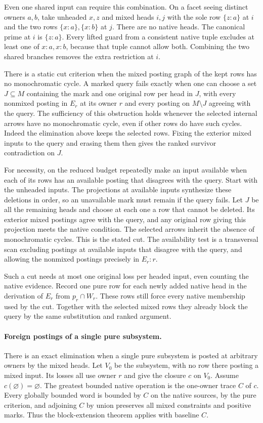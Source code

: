 Even one shared input can require this combination.
On a facet seeing distinct owners $a,b$, take unheaded
$x,z$ and mixed heads $i,j$ with the sole row
$\{z:a\}$ at $i$ and the two rows $\{x:a\},\{x:b\}$
at $j$. There are no native heads. The canonical prime
at $i$ is $\{z:a\}$. Every lifted guard from a consistent
native tuple excludes at least one of $x:a,x:b$, because
that tuple cannot allow both. Combining the two shared
branches removes the extra restriction at $i$.

There is a static cut criterion when the mixed posting
graph of the kept rows has no monochromatic cycle.
A marked query fails
exactly when one can choose a set $J\subseteq M$ containing
the mark and one original row per head in $J$, with
every nonmixed posting in $E_r$ at its owner $r$ and
every posting on $M\setminus J$ agreeing with the query.
The sufficiency of this obstruction holds whenever the
selected internal arrows have no monochromatic cycle,
even if other rows do have such cycles. Indeed the
elimination above keeps the selected rows. Fixing the
exterior mixed inputs to the query and erasing them
then gives the ranked survivor contradiction on $J$.

For necessity, on the reduced budget repeatedly make
an input available when each of its rows has an
available posting that disagrees with the query.
Start with the unheaded inputs. The projections at
available inputs synthesize these deletions in order,
so an unavailable mark must remain if the query fails.
Let $J$ be all the remaining heads and choose at each
one a row that cannot be deleted. Its exterior mixed
postings agree with the query, and any original row
giving this projection meets the native condition.
The selected arrows inherit the absence of monochromatic
cycles. This is the stated cut. The availability
test is a transversal scan excluding postings at
available inputs that disagree with the query, and
allowing the nonmixed postings precisely in $E_r:r$.

Such a cut needs at most one original loss per headed
input, even counting the native evidence. Record one
pure row for each newly added native head in the
derivation of $E_r$ from $p_r\cap W_r$. These rows still
force every native membership used by the cut. Together
with the selected mixed rows they already block the
query by the same substitution and ranked argument.

\paragraph{Foreign postings of a single pure subsystem.}
There is an exact elimination when a single pure subsystem
is posted at arbitrary owners by the mixed heads. Let $V_0$
be the subsystem, with no row there posting a mixed input.
Its losses all use owner $r$ and give the closure $c$ on
$V_0$. Assume $c(\varnothing)=\varnothing$. The greatest
bounded native operation is the one-owner trace $C$ of $c$.
Every globally bounded word is bounded by $C$ on the native
sources, by the pure criterion, and adjoining $C$ by union
preserves all mixed constraints and positive marks. Thus
the block-extension theorem applies with baseline $C$.

